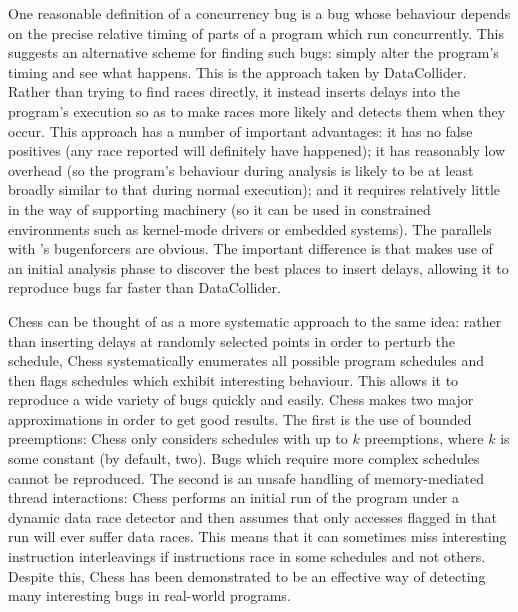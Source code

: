 One reasonable definition of a concurrency bug is a bug whose
behaviour depends on the precise relative timing of parts of a program
which run concurrently.  This suggests an alternative scheme for
finding such bugs: simply alter the program's timing and see what
happens.  This is the approach taken by
DataCollider\cite{Erickson2010}.  Rather than trying to find races
directly, it instead inserts delays into the program's execution so as
to make races more likely and detects them when they occur.  This
approach has a number of important advantages: it has no false
positives (any race reported will definitely have happened); it has
reasonably low overhead (so the program's behaviour during analysis is
likely to be at least broadly similar to that during normal
execution); and it requires relatively little in the way of supporting
machinery (so it can be used in constrained environments such as
kernel-mode drivers or embedded systems).  The parallels with
{\technique}'s \glspl{bugenforcer} are obvious.  The important
difference is that {\technique} makes use of an initial analysis phase
to discover the best places to insert delays, allowing it to reproduce
bugs far faster than DataCollider.

Chess\cite{Musuvathi2008} can be thought of as a more systematic
approach to the same idea: rather than inserting delays at randomly
selected points in order to perturb the schedule, Chess systematically
enumerates all possible program schedules and then flags schedules
which exhibit interesting behaviour.  This allows it to reproduce a
wide variety of bugs quickly and easily.  Chess makes two major
approximations in order to get good results.  The first is the use of
bounded preemptions\cite{Musuvathi2007}: Chess only considers
schedules with up to $k$ preemptions, where $k$ is some constant (by
default, two).  Bugs which require more complex schedules cannot be
reproduced.  The second is an unsafe handling of memory-mediated
thread interactions: Chess performs an initial run of the program
under a dynamic data race detector and then assumes that only accesses
flagged in that run will ever suffer data races.  This means that it
can sometimes miss interesting instruction interleavings if
instructions race in some schedules and not others.  Despite this,
Chess has been demonstrated to be an effective way of detecting many
interesting bugs in real-world programs.

